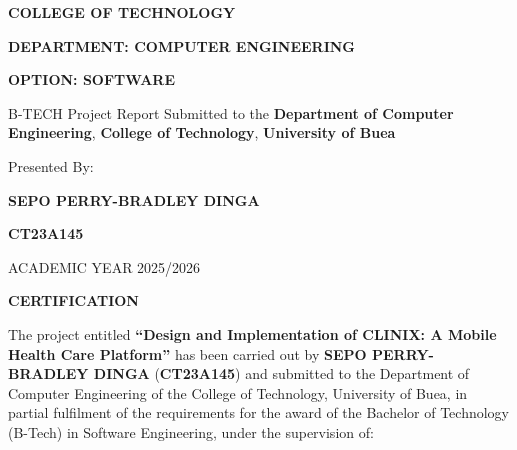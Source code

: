 \begin{titlepage}
\vspace{0.8cm}

{\Large\bfseries COLLEGE OF TECHNOLOGY \par}
\vspace{0.4cm}
{\large\bfseries DEPARTMENT: \quad COMPUTER ENGINEERING \par}
\vspace{0.2cm}
{\large\bfseries OPTION: SOFTWARE \par}

\vspace{0.9cm}

{\setlength{\fboxsep}{14pt}%
}

\vspace{1.0cm}

{\normalsize B-TECH Project Report Submitted to the \textbf{Department of Computer Engineering}, \textbf{College of Technology}, \textbf{University of Buea} \par}

\vspace{0.6cm}
{\normalsize Presented By: \par}
\vspace{0.3cm}
{\Large\bfseries SEPO PERRY-BRADLEY DINGA \par}
\vspace{0.15cm}
{\Large\bfseries CT23A145 \par}

\vfill

{\normalsize ACADEMIC YEAR 2025/2026 \par}

\end{titlepage}

\begin{center}
{\Large\bfseries CERTIFICATION}
\end{center}
\vspace{1.0cm}

The project entitled \textbf{``Design and Implementation of CLINIX: A Mobile Health Care Platform''} has been carried out by \textbf{SEPO PERRY-BRADLEY DINGA} (\textbf{CT23A145}) and submitted to the Department of Computer Engineering of the College of Technology, University of Buea, in partial fulfilment of the requirements for the award of the Bachelor of Technology (B-Tech) in Software Engineering, under the supervision of:

